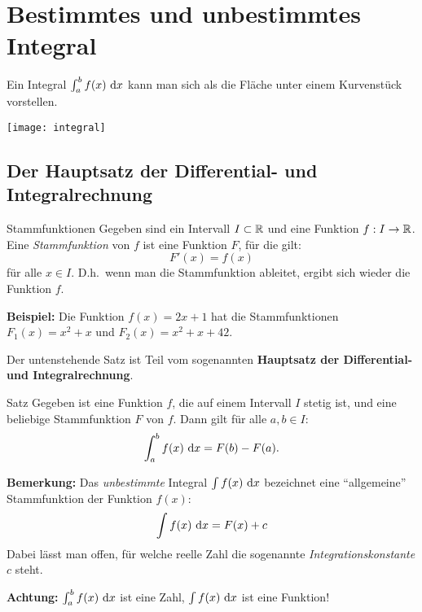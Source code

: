 \section{Bestimmtes und unbestimmtes Integral}\label{sec:integral}

Ein Integral $\int_a^b f(x) \ \mathrm{d} x$ kann man sich als die Fläche unter einem Kurvenstück vorstellen.
\begin{center}
    \texttt{[image: integral]}
\end{center}

\subsection{Der Hauptsatz der Differential- und Integralrechnung}\label{subsec:hauptsatz-integralrechnung}

\begin{definition}{Stammfunktionen}
    Gegeben sind ein Intervall $I \subset \mathbb{R}$ und eine Funktion $f : I \rightarrow \mathbb{R}$.
    Eine \emph{Stammfunktion} von $f$ ist eine Funktion $F$, für die gilt: \[F'(x) = f(x)\] für alle $x \in I$.
    D.h.\ wenn man die Stammfunktion ableitet, ergibt sich wieder die Funktion $f$.
\end{definition}

\textbf{Beispiel:} Die Funktion $f(x) = 2x + 1$ hat die Stammfunktionen $F_1(x) = x^2 + x$ und $F_2(x) = x^2 + x + 42$.

Der untenstehende Satz ist Teil vom sogenannten \textbf{Hauptsatz der Differential- und Integralrechnung}.

\begin{definition}{Satz}
    Gegeben ist eine Funktion $f$, die auf einem Intervall $I$ stetig ist, und eine beliebige Stammfunktion $F$ von $f$.
    Dann gilt für alle $a,b \in I$: \[\int_a^b f(x) \ \mathrm{d} x = F(b) - F(a).\]
\end{definition}

\textbf{Bemerkung:} Das \emph{unbestimmte} Integral $\int f(x) \ \mathrm{d} x$ bezeichnet eine ``allgemeine'' Stammfunktion der Funktion $f(x)$: \[\int f(x) \ \mathrm{d} x = F(x) + c\]
Dabei lässt man offen, für welche reelle Zahl die sogenannte \emph{Integrationskonstante} $c$ steht.

\textbf{Achtung:} $\int_a^b f(x) \ \mathrm{d} x$ ist eine Zahl, $\int f(x) \ \mathrm{d} x$ ist eine Funktion!

